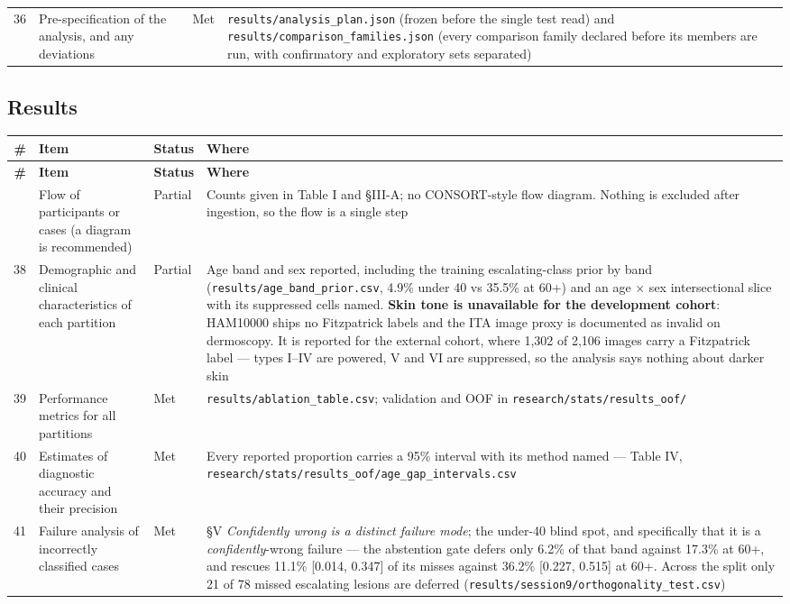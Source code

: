 \begin{longtable}{@{}rp{}lp{}@{}}
36 & Pre-specification of the analysis, and any deviations & Met & \texttt{results/analysis\_plan.json} (frozen before the single test read) and \texttt{results/comparison\_families.json} (every comparison family declared before its members are run, with confirmatory and exploratory sets separated) \\
\end{longtable}


\subsection*{Results}


\begin{longtable}{@{}rp{}lp{}@{}}
\toprule
\textbf{\#} & \textbf{Item} & \textbf{Status} & \textbf{Where} \\
\midrule
\endfirsthead
\toprule
\textbf{\#} & \textbf{Item} & \textbf{Status} & \textbf{Where} \\
\midrule
\endhead
\bottomrule
\endfoot
37 & Flow of participants or cases (a diagram is recommended) & Partial & Counts given in Table I and \S{}III-A; no CONSORT-style flow diagram. Nothing is excluded after ingestion, so the flow is a single step \\
38 & Demographic and clinical characteristics of each partition & Partial & Age band and sex reported, including the training escalating-class prior by band (\texttt{results/age\_band\_prior.csv}, 4.9\% under 40 vs 35.5\% at 60+) and an age $\times$ sex intersectional slice with its suppressed cells named. \textbf{Skin tone is unavailable for the development cohort}: HAM10000 ships no Fitzpatrick labels and the ITA image proxy is documented as invalid on dermoscopy. It is reported for the external cohort, where 1,302 of 2,106 images carry a Fitzpatrick label --- types I--IV are powered, V and VI are suppressed, so the analysis says nothing about darker skin \\
39 & Performance metrics for all partitions & Met & \texttt{results/ablation\_table.csv}; validation and OOF in \texttt{research/stats/results\_oof/} \\
40 & Estimates of diagnostic accuracy and their precision & Met & Every reported proportion carries a 95\% interval with its method named --- Table IV, \texttt{research/stats/results\_oof/age\_gap\_intervals.csv} \\
41 & Failure analysis of incorrectly classified cases & Met & \S{}V \emph{Confidently wrong is a distinct failure mode}; the under-40 blind spot, and specifically that it is a \emph{confidently}-wrong failure --- the abstention gate defers only 6.2\% of that band against 17.3\% at 60+, and rescues 11.1\% [0.014, 0.347] of its misses against 36.2\% [0.227, 0.515] at 60+. Across the split only 21 of 78 missed escalating lesions are deferred (\texttt{results/session9/orthogonality\_test.csv}) \\
\end{longtable}



